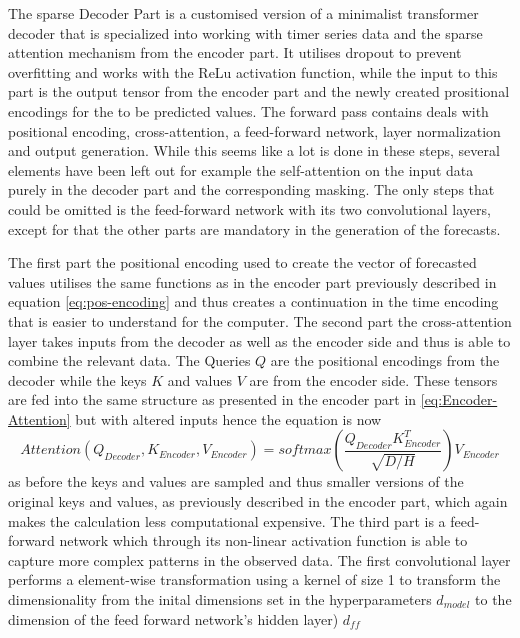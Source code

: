 \documentclass{article}
\begin{document}
The sparse Decoder Part is a customised version of a minimalist transformer decoder that is specialized into working with timer series data and the sparse attention mechanism from the encoder part. It utilises dropout to prevent overfitting and works with the ReLu activation function, while the input to this part is the output tensor from the encoder part and the newly created prositional encodings for the to be predicted values. The forward pass contains deals with positional encoding, cross-attention, a feed-forward network, layer normalization and output generation. While this seems like a lot is done in these steps, several elements have been left out for example the self-attention on the input data purely in the decoder part and the corresponding masking. The only steps that could be omitted is the feed-forward network with its two convolutional layers, except for that the other parts are mandatory in the generation of the forecasts.\par 
The first part the positional encoding used to create the vector of forecasted values utilises the same functions as in the encoder part previously described in equation \ref{eq:pos-encoding} and thus creates a continuation in the time encoding that is easier to understand for the computer. The second part the cross-attention layer takes inputs from the decoder as well as the encoder side and thus is able to combine the relevant data. The Queries $Q$ are the positional encodings from the decoder while the keys $K$ and values $V$ are from the encoder side. These tensors are fed into the same structure as presented in the encoder part in \ref{eq:Encoder-Attention} but with altered inputs hence the equation is now
\begin{equation}\label{eq:Decoder-CrossAttention}
    Attention(Q_{Decoder}, K_{Encoder}, V_{Encoder}) = softmax \left( \frac{Q_{Decoder} K_{Encoder}^T}{\sqrt{D / H}} \right) V_{Encoder}
\end{equation}
as before the keys and values are sampled and thus smaller versions of the original keys and values, as previously described in the encoder part, which again makes the calculation less computational expensive. 
The third part is a feed-forward network which through its non-linear activation function is able to capture more complex patterns in the observed data. The first convolutional layer performs a element-wise transformation using a kernel of size 1 to transform the dimensionality from the inital dimensions set in the hyperparameters $d_{model}$ to the dimension of the feed forward network's hidden layer) $d_{ff}$
\end{document}
